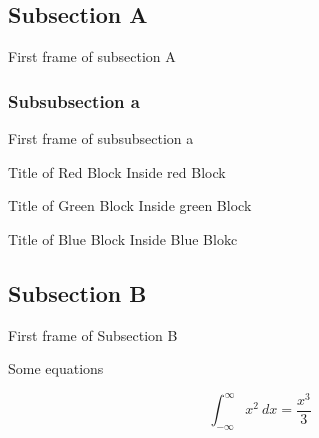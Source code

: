 \subsection{Subsection A}

\begin{frame}{First frame of subsection A}
    \lipsum[1]    
\end{frame}

\subsubsection{Subsubsection a}

\begin{frame}{First frame of subsubsection a}
    \begin{redblock}{Title of Red Block}
        Inside red Block
    \end{redblock}
    
    \begin{greenblock}{Title of Green Block}
        Inside green Block
    \end{greenblock}
    
    \begin{blueblock}{Title of Blue Block}
    Inside Blue Blokc
    \end{blueblock}
    
\end{frame}

\subsection{Subsection B}

\begin{frame}{First frame of Subsection B}

Some equations

\begin{equation}
    \displaystyle\int^\infty_{-\infty} x^2 ~dx = \frac{x^3}{3}
\end{equation}


\end{frame}
